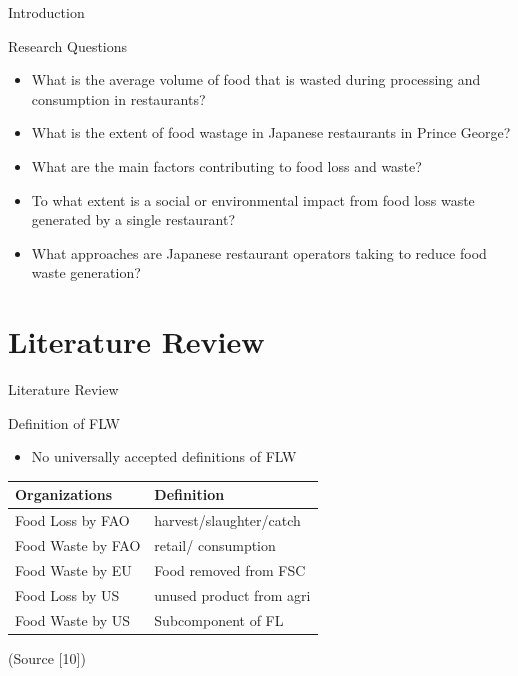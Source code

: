 \documentclass[
  ignorenonframetext,
]{beamer}
\providecommand{\tightlist}{%
  \setlength{\itemsep}{0pt}\setlength{\parskip}{0pt}}
\begin{document}
\begin{frame}{Introduction}
\protect\hypertarget{introduction-3}{}
\begin{block}{Research Questions}
\protect\hypertarget{research-questions}{}
\begin{itemize}
\tightlist
\item
  What is the average volume of food that is wasted during processing
  and consumption in restaurants?
\item
  What is the extent of food wastage in Japanese restaurants in Prince
  George?
\item
  What are the main factors contributing to food loss and waste?
\item
  To what extent is a social or environmental impact from food loss
  waste generated by a single restaurant?
\item
  What approaches are Japanese restaurant operators taking to reduce
  food waste generation?
\end{itemize}
\end{block}
\end{frame}

\hypertarget{literature-review}{%
\section{Literature Review}\label{literature-review}}

\begin{frame}{Literature Review}
\protect\hypertarget{literature-review-1}{}
\begin{block}{Definition of FLW}
\protect\hypertarget{definition-of-flw}{}
\begin{itemize}
\tightlist
\item
  No universally accepted definitions of FLW
\end{itemize}

\begin{longtable}[]{@{}ll@{}}
\toprule()
Organizations & Definition \\
\midrule()
\endhead
Food Loss by FAO & harvest/slaughter/catch \\
Food Waste by FAO & retail/ consumption \\
Food Waste by EU & Food removed from FSC \\
Food Loss by US & unused product from agri \\
Food Waste by US & Subcomponent of FL \\
\bottomrule()
\end{longtable}

(Source {[}10{]})
\end{block}
\end{frame}
\end{document}
